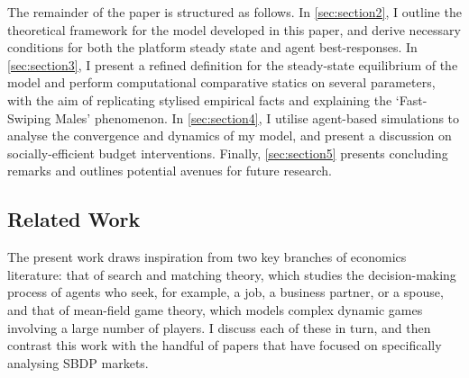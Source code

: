The remainder of the paper is structured as follows. In \autoref{sec:section2}, I outline the theoretical framework for the model developed in this paper, and derive necessary conditions for both the platform steady state and agent best-responses. In \autoref{sec:section3}, I present a refined definition for the steady-state equilibrium of the model and perform computational comparative statics on several parameters, with the aim of replicating stylised empirical facts and explaining the `Fast-Swiping Males' phenomenon. In \autoref{sec:section4}, I utilise agent-based simulations to analyse the convergence and dynamics of my model, and present a discussion on socially-efficient budget interventions. Finally, \autoref{sec:section5} presents concluding remarks and outlines potential avenues for future research.

\subsection{Related Work}
The present work draws inspiration from two key branches of economics literature: that of search and matching theory, which studies the decision-making process of agents who seek, for example, a job, a business partner, or a spouse, and that of mean-field game theory, which models complex dynamic games involving a large number of players. 
I discuss each of these in turn, and then contrast this work with the handful of papers that have focused on specifically analysing SBDP markets.


